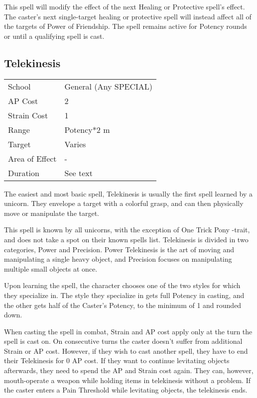 \documentclass[11pt,a4paper,twocolumn]{book}
\begin{document}
This spell will modify the effect of the next Healing or Protective spell's effect. The caster's next single-target healing or protective spell will instead affect all of the targets of Power of Friendship. The spell remains active for Potency rounds or until a qualifying spell is cast.


\subsection*{Telekinesis}
{
	\begin{tabu} to 75mm{| X[l,4] | X[l,7] |}
		\hline
		School 			& General (Any SPECIAL) 		\\
		AP Cost	      	& 2 						\\
		Strain Cost     & 1 						\\
		Range     		& Potency*2 m					\\
		Target      	& Varies					\\
		Area of Effect  & - 	 						\\
		Duration     	& See text					\\ \hline
	\end{tabu}
	
}

\medskip

The easiest and most basic spell, Telekinesis is usually the first spell learned by a unicorn. They envelope a target with a colorful grasp, and can then physically move or manipulate the target.

This spell is known by all unicorns, with the exception of One Trick Pony -trait, and does not take a spot on their known spells list. Telekinesis is divided in two categories, Power and Precision. Power Telekinesis is the art of moving and manipulating a single heavy object, and Precision focuses on manipulating multiple small objects at once.

Upon learning the spell, the character chooses one of the two styles for which they specialize in. The style they specialize in gets full Potency in casting, and the other gets half of the Caster's Potency, to the minimum of 1 and rounded down.

When casting the spell in combat, Strain and AP cost apply only at the turn the spell is cast on. On consecutive turns the caster doesn't suffer from additional Strain or AP cost. However, if they wish to cast another spell, they have to end their Telekinesis for 0 AP cost. If they want to continue levitating objects afterwards, they need to spend the AP and Strain cost again. They can, however, mouth-operate a weapon while holding items in telekinesis without a problem. If the caster enters a Pain Threshold while levitating objects, the telekinesis ends.
\end{document}

